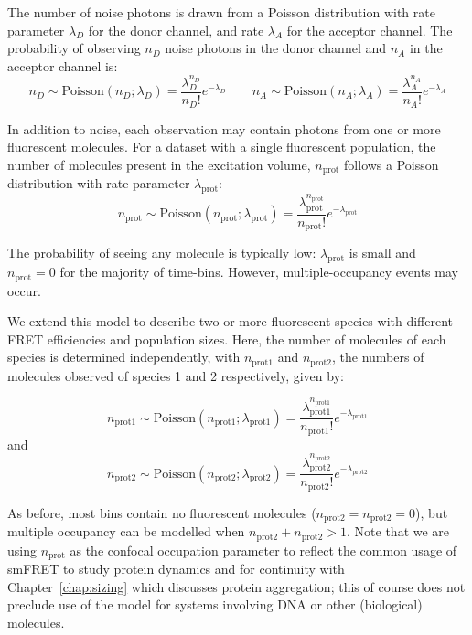 The number of noise photons is drawn from a Poisson distribution with rate parameter $\lambda_D$ for the donor channel, and rate $\lambda_A$ for the acceptor channel. The probability of observing $n_D$ noise photons in the donor channel and $n_A$ in the acceptor channel is:
\begin{equation}
n_{D} \sim \text{Poisson}(n_{D}; \lambda_{D}) = \frac{\lambda_{D}^{n_{D}}}{n_{D}!}e^{-\lambda_{D}}
\qquad
n_{A} \sim \text{Poisson}(n_{A}; \lambda_{A}) = \frac{\lambda_{A}^{n_{A}}}{n_{A}!}e^{-\lambda_{A}}
\end{equation}

In addition to noise, each observation may contain photons from one or more fluorescent molecules. For a dataset with a single fluorescent population, the number of molecules present in the excitation volume, $n_{\text{prot}}$ follows a Poisson distribution with rate parameter $\lambda_{\text{prot}}$:
\begin{equation}
n_{\text{prot}} \sim \text{Poisson}(n_{\text{prot}}; \lambda_{\text{prot}}) = \frac{\lambda_{\text{prot}}^{n_{\text{prot}}}}{n_{\text{prot}}!}e^{-\lambda_{\text{prot}}}
\label{eq:nprot}
\end{equation}

The probability of seeing any molecule is typically low: $\lambda_{\text{prot}}$ is small and $n_{\text{prot}} = 0$ for the majority of time-bins. However, multiple-occupancy events may occur.

We extend this model to describe two or more fluorescent species with different FRET efficiencies and population sizes. Here, the number of molecules of each species is determined independently, with $n_{\text{prot1}}$ and $n_{\text{prot2}}$, the numbers of molecules observed of species 1 and 2 respectively, given by:

\begin{equation}
n_{\text{prot1}} \sim \text{Poisson}(n_{\text{prot1}}; \lambda_{\text{prot1}}) = \frac{\lambda_{\text{prot1}}^{n_{\text{prot1}}}}{n_{\text{prot1}}!}e^{-\lambda_{\text{prot1}}}
\end{equation}
and
\begin{equation}
n_{\text{prot2}} \sim \text{Poisson}(n_{\text{prot2}}; \lambda_{\text{prot2}}) = \frac{\lambda_{\text{prot2}}^{n_{\text{prot2}}}}{n_{\text{prot2}}!}e^{-\lambda_{\text{prot2}}}
\end{equation}

As before, most bins contain no fluorescent molecules ($n_{\text{prot2}} = n_{\text{prot2}} = 0$), but multiple occupancy can be modelled when $n_{\text{prot2}} + n_{\text{prot2}} >1$. Note that we are using $n_{\text{prot}}$ as the confocal occupation parameter to reflect the common usage of smFRET to study protein dynamics and for continuity with Chapter~\ref{chap:sizing} which discusses protein aggregation; this of course does not preclude use of the model for systems involving DNA or other (biological) molecules.

